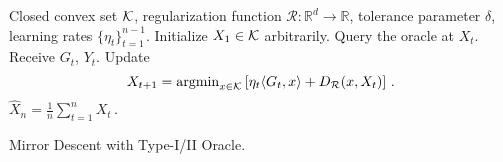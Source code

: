%

\begin{algorithm}[t]
\begin{algorithmic}
      Closed convex set $\mathcal{K}$, regularization function $\mathcal{R}:\mathbb{R}^d\to \mathbb{R}$, tolerance parameter $\delta$, learning rates $\{\eta_t\}_{t=1}^{n-1}$.
\State Initialize $X_1\in \mathcal{K}$ arbitrarily.
	\State Query the oracle at $X_t$.
	\State Receive $G_t$, $Y_t$.
	\State Update
	$$
	X_{t+1}=\operatorname{argmin}_{x\in \mathcal{K}}\left[ \eta_{t} \langle G_t,x \rangle+D_{\mathcal{R}}(x,X_t) \right] \,.
	$$
\EndFor
{} $\hat{X}_n = \frac{1}{n}\sum_{t=1}^n X_t \,.$
\end{algorithmic}
\caption{Mirror Descent with Type-I/II Oracle.}
\label{alg}
\end{algorithm}


% 	

